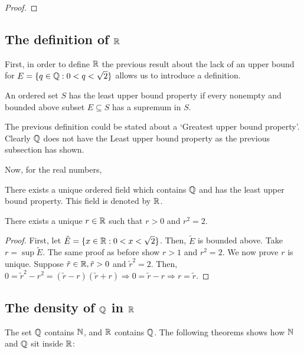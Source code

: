 \begin{proof}
\end{proof}

\subsection{The definition of $\R$}

First, in order to define $\R$ the previous result about the lack of an upper bound for $E = \{ q \in \mathbb{Q}: 0 < q < \sqrt{2}\}$ allows us to introduce a definition.

\begin{definition}
    An ordered set $S$ has the least upper bound property if every nonempty and bounded above subset $E \subseteq S$ has a supremum in $S$.
\end{definition}

The previous definition could be stated about a `Greatest upper bound property'. Clearly $\mathbb{Q}$ does not have the Least upper bound property as the previous subsection has shown.

Now, for the real numbers,

\begin{theorem}[Existence of $\R$]
    There exists a unique ordered field which contains $\mathbb{Q}$ and has the least upper bound property. This field is denoted by $\R$.
\end{theorem}

\begin{theorem}
    There exists a unique $r \in \mathbb{R}$ such that $r>0$ and $r^2 = 2$.
\end{theorem}

\begin{proof}
    First, let $\tilde{E} = \{ x \in \mathbb{R}: 0 < x < \sqrt{2} \}$. Then, $\tilde{E}$ is bounded above. Take $r = \sup \tilde{E}$. The same proof as before show $r > 1$ and $r^2 = 2$. We now prove $r$ is unique. Suppose $\tilde{r} \in \mathbb{R}, \tilde{r}>0$ and $\tilde{r}^2 = 2$. Then, $0 = \tilde{r}^2 - r^2 = (\tilde{r} - r)(\tilde{r} + r) \Rightarrow 0 = \tilde{r} - r \Rightarrow r = \tilde{r}$.
\end{proof}

\subsection{The density of $\mathbb{Q}$ in $\R$}

The set $\mathbb{Q}$ contains $\mathbb{N}$, and $\R$ contains $\mathbb{Q}$. The following theorems shows how $\mathbb{N}$ and $\mathbb{Q}$ sit inside $\R$:

